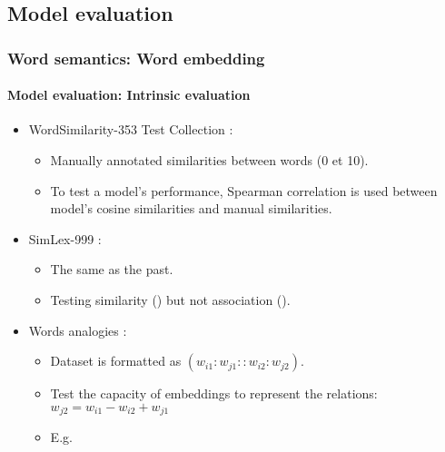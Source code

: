 \documentclass[xcolor=table]{beamer}
\begin{document}
\subsection{Model evaluation}

\begin{frame}
\frametitle{Word semantics: Word embedding}
\framesubtitle{Model evaluation: Intrinsic evaluation}

\begin{itemize}
	\item  WordSimilarity-353 Test Collection \cite{2002-finkelstein-al}:
	\begin{itemize}
		\item Manually annotated similarities between words (0 et 10).
		\item To test a model's performance, Spearman correlation is used between model's cosine similarities and manual similarities.
	\end{itemize}
	
	\item SimLex-999 \cite{2015-hill-al}:
	\begin{itemize}
		\item The same as the past.
		\item Testing similarity () but not association ().
	\end{itemize}

	\item Words analogies \cite{2013-mikolov-al2}:
	\begin{itemize}
		\item Dataset is formatted as $(w_{i1}:w_{j1} :: w_{i2}:w_{j2})$.
		\item Test the capacity of embeddings to represent the relations: $w_{j2} = w_{i1} - w_{i2} + w_{j1}$
		\item E.g. 
	\end{itemize}

\end{itemize}
	
\end{frame}
\end{document}
